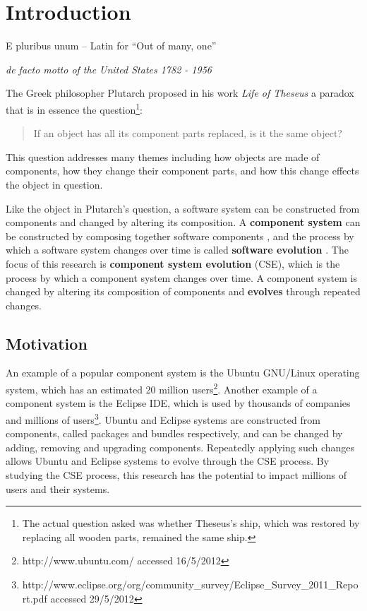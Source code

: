 \chapter{Introduction}
\label{introduction}
\epigraph{E pluribus unum -- Latin for ``Out of many, one''}
{\textit{de facto motto of the United States 1782 - 1956}}
The Greek philosopher Plutarch proposed in his work \textit{Life of Theseus} a paradox that is in essence the question\footnote{The actual question asked was whether Theseus's ship, which was restored by replacing all wooden parts, remained the same ship.}:
\begin{quote}
If an object has all its component parts replaced, is it the same object?
\end{quote}
This question addresses many themes including how objects are made of components, how they change their component parts,
and how this change effects the object in question.

Like the object in Plutarch's question, a software system can be constructed from components and changed by altering its composition.
A \textbf{component system} can be constructed by composing together software components \citep{Szyperski2002},
and the process by which a software system changes over time is called \textbf{software evolution} \citep{lehman1980}.
The focus of this research is \textbf{component system evolution} (CSE), which is the process by which a component system changes over time.
A component system is changed by altering its composition of components and \textbf{evolves} through repeated changes.

\section{Motivation}

An example of a popular component system is the Ubuntu GNU/Linux operating system, which has an estimated 20 million users\footnote{http://www.ubuntu.com/ accessed 16/5/2012}. 
Another example of a component system is the Eclipse IDE, which is used by thousands of companies and millions of users\footnote{http://www.eclipse.org/org/community\_survey/Eclipse\_Survey\_2011\_Report.pdf  accessed 29/5/2012}.
Ubuntu and Eclipse systems are constructed from components, called packages and bundles respectively, 
and can be changed by adding, removing and upgrading components.
Repeatedly applying such changes allows Ubuntu and Eclipse systems to evolve through the CSE process.
By studying the CSE process,
this research has the potential to impact millions of users and their systems.

